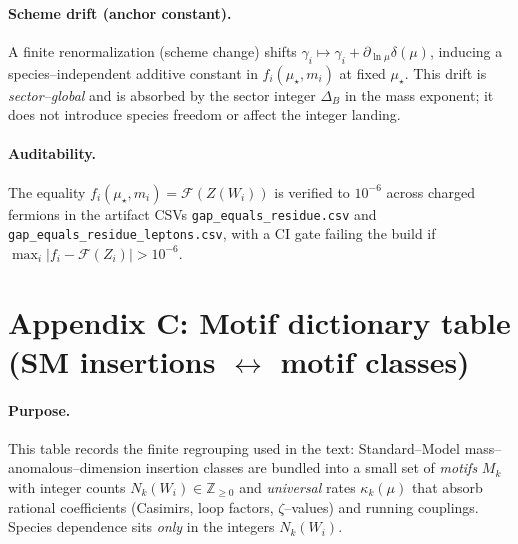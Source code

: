 \documentclass[epjc3]{svjour3}
\begin{document}
\paragraph{Scheme drift (anchor constant).}
A finite renormalization (scheme change) shifts $\gamma_i\mapsto\gamma_i+\partial_{\ln\mu}\delta(\mu)$, inducing a species–independent additive constant in $f_i(\mu_\star,m_i)$ at fixed $\mu_\star$.  This drift is \emph{sector–global} and is absorbed by the sector integer $\Delta_B$ in the mass exponent; it does not introduce species freedom or affect the integer landing.

\paragraph{Auditability.}
The equality $f_i(\mu_\star,m_i)=\mathcal F(Z(W_i))$ is verified to $10^{-6}$ across charged fermions in the artifact CSVs \texttt{gap\_equals\_residue.csv} and \texttt{gap\_equals\_residue\_leptons.csv}, with a CI gate failing the build if $\max_i |f_i-\mathcal F(Z_i)|>10^{-6}$.

\section*{Appendix C: Motif dictionary table (SM insertions $\leftrightarrow$ motif classes)}

\paragraph{Purpose.}
This table records the finite regrouping used in the text: Standard--Model mass–anomalous–dimension insertion classes are bundled into a small set of \emph{motifs} $M_k$ with integer counts $N_k(W_i)\in\mathbb{Z}_{\ge0}$ and \emph{universal} rates $\kappa_k(\mu)$ that absorb rational coefficients (Casimirs, loop factors, $\zeta$–values) and running couplings. Species dependence sits \emph{only} in the integers $N_k(W_i)$.
\end{document}
